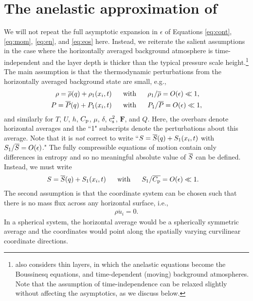 \documentclass[12pt]{article}
\newcommand{\vecf}{\bm{F}}
\begin{document}
	\section{The anelastic approximation of \citet{Gough1969}}
	We will not repeat the full asymptotic expansion in $\epsilon$ of Equations \eqref{eq:cont}, \eqref{eq:mom}, \eqref{eq:en}, and \eqref{eq:eos} here. Instead, we reiterate the salient assumptions in the case where the horizontally averaged background atmosphere is time-independent and the layer depth is thicker than the typical pressure scale height.\footnote{\citet{Gough1969} also considers thin layers, in which the anelastic equations become the Boussinesq equations, and time-dependent (moving) background atmospheres. Note that the assumption of time-independence can be relaxed slightly without affecting the asymptotics, as we discuss below.} The main assumption is that the thermodynamic perturbations from the horizontally averaged background state are small, e.g.,
	\begin{align}\label{eq:linearthermo}
		\rho = \overline{\rho}(q) + \rho_1(x_i,t)\ \ \ \ \  &\text{with}\ \ \ \ \  \rho_1/\overline{\rho}=O(\epsilon)\ll 1,\\
		P = \overline{P}(q) + P_1(x_i,t)\ \ \ \ \  &\text{with}\ \ \ \ \  P_1/\overline{P}=O(\epsilon)\ll1 \nonumber,
	\end{align} 
	and similarly for $T$, $U$, $h$, $C_{\rm{p}}$, $\mu$, $\delta$, $c_{\rm s}^2$, $\vecf$, and $Q$. Here, the overbars denote horizontal averages and the ``1" subscripts denote the perturbations about this average. Note that it is \textit{not} correct to write ``$S=\overline{S}(q)+S_1(x_i,t)$ with $S_1/\overline{S}=O(\epsilon)$." The fully compressible equations of motion contain only differences in entropy and so no meaningful absolute value of $\overline{S}$ can be defined. Instead, we must write
	\begin{align}\label{eq:linearent}
	S = \overline{S}(q) + S_1(x_i,t) \ \ \ \ \  &\text{with}\ \ \ \ \  S_1/\overline{C_{\rm{p}}}=O(\epsilon)\ll 1.
	\end{align} 
	The second assumption is that the coordinate system can be chosen such that there is no mass flux across any horizontal surface, i.e.,
	\begin{align}\label{eq:nomassflux}
		\overline{\rho u_i}=0.
	\end{align}
	In a spherical system, the horizontal average would be a spherically symmetric average and the coordinates would point along the spatially varying curvilinear coordinate directions. 
	
\end{document}
